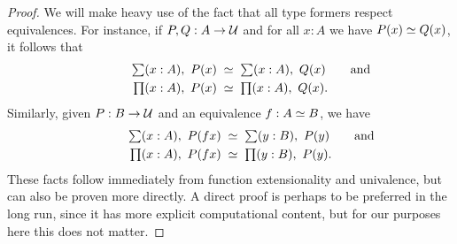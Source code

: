 \begin{proof}
  We will make heavy use of the fact that all type formers respect equivalences.
  For instance, if $P,Q:A\to\mathcal{U}$ and for all $x:A$ we have $P(x) \simeq Q(x)$, it follows that
  \begin{align*}
    \sm{x:A}P(x) &\;\simeq\; \sm{x:A}Q(x)\mathrlap{\qquad\text{and}}\\
    \prd{x:A}P(x) &\;\simeq\; \prd{x:A}Q(x).
  \end{align*}
  Similarly, given $P:B\to\mathcal{U}$ and an equivalence $f:A \simeq B$, we have
  \begin{align}
    \sm{x:A}P(fx) &\;\simeq\; \sm{y:B}P(y)\mathrlap{\qquad\text{and}}\label{eq:sigma-baseequiv}\\
    \prd{x:A}P(fx) &\;\simeq\; \prd{y:B}P(y).\label{eq:pi-baseequiv}
  \end{align}
  These facts follow immediately from function extensionality and univalence, but can also be proven more directly.
  A direct proof is perhaps to be preferred in the long run, since it has more explicit computational content, but for our purposes here this does not matter.


\end{proof}
